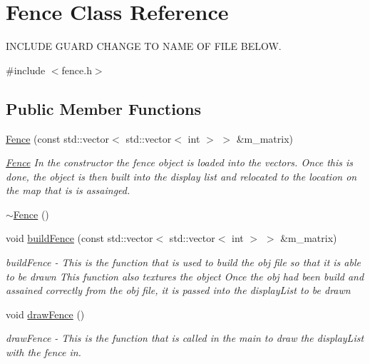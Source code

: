 \hypertarget{classFence}{
\section{Fence Class Reference}
\label{classFence}
}


INCLUDE GUARD CHANGE TO NAME OF FILE BELOW.  


{\ttfamily \#include $<$fence.h$>$}\subsection*{Public Member Functions}
\begin{DoxyCompactItemize}
\item 
\hyperlink{classFence_a0a7cb5b042c919c097ce9f1476447dfa}{Fence} (const std::vector$<$ std::vector$<$ int $>$ $>$ \&m\_\-matrix)
\begin{DoxyCompactList}\small\item\em \hyperlink{classFence}{Fence} In the constructor the fence object is loaded into the vectors. Once this is done, the object is then built into the display list and relocated to the location on the map that is is assainged. \item\end{DoxyCompactList}\item 
\hyperlink{classFence_a542d1f0e5b80afc0b19865071cd6c616}{$\sim$Fence} ()
\item 
void \hyperlink{classFence_a6d6131c45143ce2d601ce92e2d621460}{buildFence} (const std::vector$<$ std::vector$<$ int $>$ $>$ \&m\_\-matrix)
\begin{DoxyCompactList}\small\item\em buildFence -\/ This is the function that is used to build the obj file so that it is able to be drawn This function also textures the object Once the obj had been build and assained correctly from the obj file, it is passed into the displayList to be drawn \item\end{DoxyCompactList}\item 
\hypertarget{classFence_a74e1769df18ddc2b70a84378ff276fee}{
void \hyperlink{classFence_a74e1769df18ddc2b70a84378ff276fee}{drawFence} ()}
\label{classFence_a74e1769df18ddc2b70a84378ff276fee}

\begin{DoxyCompactList}\small\item\em drawFence -\/ This is the function that is called in the main to draw the displayList with the fence in. \item\end{DoxyCompactList}\end{DoxyCompactItemize}
